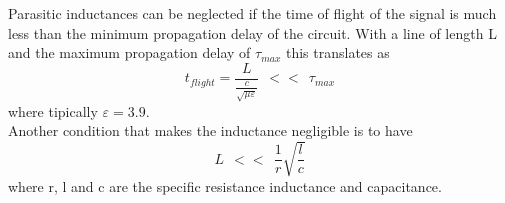 Parasitic inductances can be neglected if the time of flight of the signal is much less than the minimum propagation delay of the circuit. With a line of length L and the maximum propagation delay of $\tau_{max}$ this translates as 
\begin{equation}
t_{flight}=\frac{L}{\frac{c}{\sqrt{\mu \varepsilon}}}\ \  << \ \ \tau_{max}     
\end{equation}
where tipically $\varepsilon=3.9$.\\
\vspace{5mm}
Another condition that makes the inductance negligible is to have
\begin{equation}
L\ \ <<\ \ \frac{1}{r}\sqrt{\frac{l}{c}}
\end{equation}
where r, l and c are the specific resistance inductance and capacitance.\\
